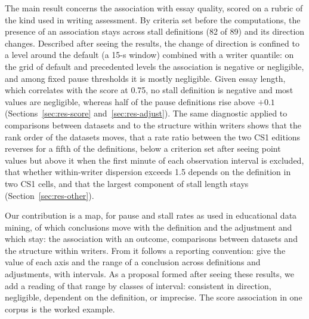 The main result concerns the association with essay quality, scored on a rubric of the kind used in writing
assessment. By criteria set before the computations, the presence of an association stays across stall definitions
(82 of 89) and its direction changes. Described after seeing the results, the change of direction is confined to a
level around the default (a 15-s window) combined with a writer quantile: on the grid of default and precedented
levels the association is negative or negligible, and among fixed pause thresholds it is mostly negligible. Given essay
length, which correlates with the score at 0.75, no stall definition is negative and most values are negligible,
whereas half of the pause definitions rise above $+0.1$ (Sections~\ref{sec:res-score} and~\ref{sec:res-adjust}). The
same diagnostic applied to comparisons between datasets and to the structure within writers shows that the rank order
of the datasets moves, that a rate ratio between the two CS1 editions reverses for a fifth of the definitions, below a
criterion set after seeing point values but above it when the first minute of each observation interval is
excluded, that whether within-writer dispersion exceeds 1.5 depends on the definition in
two CS1 cells, and that the largest component of stall length stays (Section~\ref{sec:res-other}).

Our contribution is a map, for pause and stall rates as used in educational data mining, of which conclusions move
with the definition and the adjustment and which stay: the association with an outcome, comparisons between datasets
and the structure within writers. From it follows a reporting convention: give the value of each axis and the range
of a conclusion across definitions and adjustments, with intervals. As a proposal formed after seeing these results,
we add a reading of that range by classes of interval: consistent in direction, negligible, dependent on the
definition, or imprecise. The score association in one corpus is the worked example.
